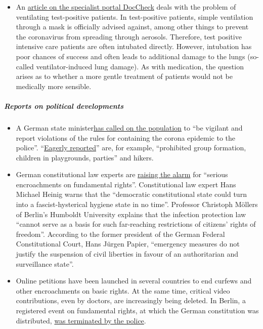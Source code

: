 \begin{itemize}
\item
  An
  \href{https://www.doccheck.com/de/detail/articles/26271-covid-19-beatmung-und-dann}{article
  on the specialist portal DocCheck} deals with the problem of
  ventilating test-positive patients. In test-positive patients, simple
  ventilation through a mask is officially advised against, among other
  things to prevent the coronavirus from spreading through aerosols.
  Therefore, test positive intensive care patients are often intubated
  directly. However, intubation has poor chances of success and often
  leads to additional damage to the lungs (so-called ventilator-induced
  lung damage). As with medication, the question arises as to whether a
  more gentle treatment of patients would not be medically more
  sensible.
\end{itemize}

\hypertarget{reports-on-political-developments}{%
\subparagraph{\texorpdfstring{\textbf{Reports on political
developments}}{Reports on political developments}}\label{reports-on-political-developments}}

\begin{itemize}
\tightlist
\item
  A German state
  minister\href{https://de.nachrichten.yahoo.com/strobl-b\%C3\%BCrger-verst\%C3\%B6\%C3\%9Fe-gegen-corona-regeln-polizei-melden-095746341.html}{has
  called on the population} to ``be vigilant and report violations of
  the rules for containing the corona epidemic to the police''.
  ``\href{https://www.br.de/nachrichten/bayern/buerger-melden-eifrig-verstoesse-gegen-corona-regeln,RuGXp1h}{Eagerly
  reported}'' are, for example, ``prohibited group formation, children
  in playgrounds, parties'' and hikers.
\item
  German constitutional law experts are
  \href{https://www.focus.de/politik/deutschland/corona-regelungen-der-regierung-medizin-darf-nicht-gefaehrlicher-sein-als-die-krankheit_id_11827625.html}{raising
  the alarm} for ``serious encroachments on fundamental rights''.
  Constitutional law expert Hans Michael Heinig warns that the
  ``democratic constitutional state could turn into a fascist-hysterical
  hygiene state in no time''. Professor Christoph Möllers of Berlin's
  Humboldt University explains that the infection protection law
  ``cannot serve as a basis for such far-reaching restrictions of
  citizens' rights of freedom''. According to the former president of
  the German Federal Constitutional Court, Hans Jürgen Papier,
  ``emergency measures do not justify the suspension of civil liberties
  in favour of an authoritarian and surveillance state''.
\item
  Online petitions have been launched in several countries to end
  curfews and other encroachments on basic rights. At the same time,
  critical video contributions, even by doctors, are increasingly being
  deleted. In Berlin, a registered event on fundamental rights, at which
  the German constitution was distributed,
  \href{https://kenfm.de/berliner-corona-demo-strafbar-aufgeloest-aber-froehlich/}{was
  terminated by the police}.
\end{itemize}

